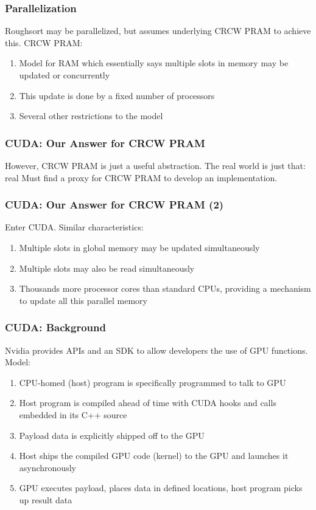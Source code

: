 \documentclass[10pt, xcolor={dvipsnames}, aspectratio=169]{beamer}
\begin{document}

\begin{frame}
\frametitle{Parallelization}
Roughsort may be parallelized, but assumes underlying CRCW PRAM to achieve this.
\newline\newline
CRCW PRAM:
\begin{enumerate}
\item Model for RAM which essentially says multiple slots in memory may be updated or concurrently
\item This update is done by a fixed number of processors
\item Several other restrictions to the model
\end{enumerate}
\end{frame}

\begin{frame}
\frametitle{CUDA: Our Answer for CRCW PRAM}
However, CRCW PRAM is just a useful abstraction.  The real world is just that: real
\newline\newline
Must find a proxy for CRCW PRAM to develop an implementation.
\end{frame}

\begin{frame}
\frametitle{CUDA: Our Answer for CRCW PRAM (2)}
Enter CUDA.  Similar characteristics:
\begin{enumerate}
\item Multiple slots in global memory may be updated simultaneously
\item Multiple slots may also be read simultaneously
\item Thousands more processor cores than standard CPUs, providing a mechanism to update all this parallel memory
\end{enumerate}
\end{frame}

\begin{frame}
\frametitle{CUDA: Background}
Nvidia provides APIs and an SDK to allow developers the use of GPU functions.
\newline\newline
Model:
\begin{enumerate}
	\item CPU-homed (host) program is specifically programmed to talk to GPU
	\item Host program is compiled ahead of time with CUDA hooks and calls embedded in its C++ source
	\item Payload data is explicitly shipped off to the GPU
	\item Host ships the compiled GPU code (kernel) to the GPU and launches it asynchronously
	\item GPU executes payload, places data in defined locations, host program picks up result data
\end{enumerate}
\end{frame}
\end{document}
